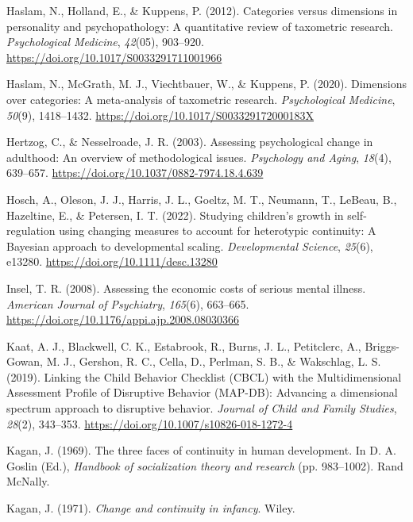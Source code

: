 \documentclass[
  american,
  letterpaper,
  12pt]{article}
\newlength{\cslhangindent}
\newenvironment{CSLReferences}[2] %
 {\begin{list}{}{%
  \setlength{\itemindent}{0pt}
  \setlength{\leftmargin}{0pt}
  \setlength{\parsep}{0pt}
  \ifodd #1
   \setlength{\leftmargin}{\cslhangindent}
   \setlength{\itemindent}{-1\cslhangindent}
  \fi
  \setlength{\itemsep}{#2\baselineskip}}}
 {\end{list}}
\begin{document}
\begin{CSLReferences}{1}{0}
Haslam, N., Holland, E., \& Kuppens, P. (2012). Categories versus
dimensions in personality and psychopathology: {A} quantitative review
of taxometric research. \emph{Psychological Medicine}, \emph{42}(05),
903--920. \url{https://doi.org/10.1017/S0033291711001966}

Haslam, N., McGrath, M. J., Viechtbauer, W., \& Kuppens, P. (2020).
Dimensions over categories: {A} meta-analysis of taxometric research.
\emph{Psychological Medicine}, \emph{50}(9), 1418--1432.
\url{https://doi.org/10.1017/S003329172000183X}

Hertzog, C., \& Nesselroade, J. R. (2003). Assessing psychological
change in adulthood: {An} overview of methodological issues.
\emph{Psychology and Aging}, \emph{18}(4), 639--657.
\url{https://doi.org/10.1037/0882-7974.18.4.639}

Hosch, A., Oleson, J. J., Harris, J. L., Goeltz, M. T., Neumann, T.,
LeBeau, B., Hazeltine, E., \& Petersen, I. T. (2022). Studying
children's growth in self-regulation using changing measures to account
for heterotypic continuity: {A} {Bayesian} approach to developmental
scaling. \emph{Developmental Science}, \emph{25}(6), e13280.
\url{https://doi.org/10.1111/desc.13280}

Insel, T. R. (2008). Assessing the economic costs of serious mental
illness. \emph{American Journal of Psychiatry}, \emph{165}(6), 663--665.
\url{https://doi.org/10.1176/appi.ajp.2008.08030366}

Kaat, A. J., Blackwell, C. K., Estabrook, R., Burns, J. L., Petitclerc,
A., Briggs-Gowan, M. J., Gershon, R. C., Cella, D., Perlman, S. B., \&
Wakschlag, L. S. (2019). Linking the {Child Behavior Checklist} ({CBCL})
with the {Multidimensional Assessment Profile of Disruptive Behavior}
({MAP-DB}): {Advancing} a dimensional spectrum approach to disruptive
behavior. \emph{Journal of Child and Family Studies}, \emph{28}(2),
343--353. \url{https://doi.org/10.1007/s10826-018-1272-4}

Kagan, J. (1969). The three faces of continuity in human development. In
D. A. Goslin (Ed.), \emph{Handbook of socialization theory and research}
(pp. 983--1002). Rand McNally.

Kagan, J. (1971). \emph{Change and continuity in infancy}. Wiley.


\end{CSLReferences}
\end{document}
